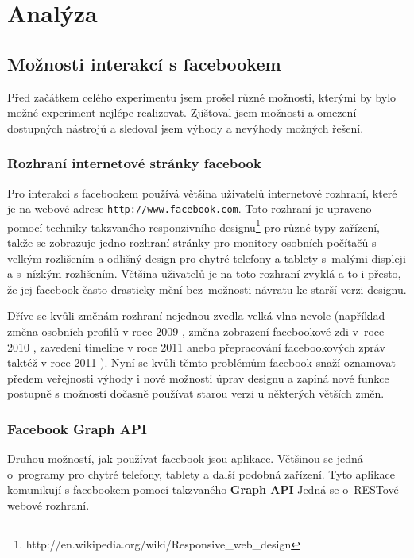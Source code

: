 \documentclass[thesis=M,czech]{FITthesis}[2013/05/10]
\begin{document}
\chapter{Analýza}

\section{Možnosti interakcí s facebookem}

Před začátkem celého experimentu jsem prošel různé možnosti, kterými by bylo možné experiment nejlépe realizovat. Zjišťoval jsem možnosti a omezení dostupných nástrojů a sledoval jsem výhody a nevýhody možných řešení. 

\subsection{Rozhraní internetové stránky facebook}

Pro interakci s facebookem používá většina uživatelů internetové rozhraní, které je na webové adrese \verb|http://www.facebook.com|. Toto rozhraní je upraveno pomocí techniky takzvaného responzivního designu\footnote{http://en.wikipedia.org/wiki/Responsive\_web\_design} pro různé typy zařízení, takže se zobrazuje jedno rozhraní stránky pro monitory osobních počítačů s velkým rozlišením a odlišný design pro chytré telefony a tablety s~malými displeji a s~nízkým rozlišením. Většina uživatelů je na toto rozhraní zvyklá a to i přesto, že jej facebook často drasticky mění bez~možnosti návratu ke starší verzi designu. 

Dříve se kvůli změnám rozhraní nejednou zvedla velká vlna nevole (například změna osobních profilů v roce 2009 \cite{web:fbNewHomePage}, změna zobrazení facebookové zdi v~roce  2010 \cite{web:fbNewNavigation}, zavedení timeline v roce 2011 \cite{web:fbNewTimeline} anebo přepracování facebookových zpráv taktéž v roce 2011 \cite{web:fbNewMessages}). Nyní se kvůli těmto problémům facebook snaží oznamovat předem veřejnosti výhody i nové možnosti úprav designu a zapíná nové funkce postupně s možností dočasně používat starou verzi u některých větších změn.

\subsection{Facebook Graph API}
Druhou možností, jak používat facebook jsou aplikace. Většinou se jedná o~programy pro chytré telefony, tablety a další podobná zařízení. Tyto aplikace komunikují s facebookem pomocí takzvaného \textbf{Graph API} \cite{web:fbGraphApi} Jedná se o~RESTové webové rozhraní.
\end{document}
